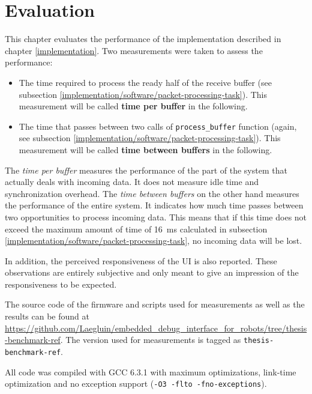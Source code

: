 \chapter{Evaluation}
\label{evaluation}


This chapter evaluates the performance of the implementation described in chapter \ref{implementation}.
Two measurements were taken to assess the performance:

\begin{itemize}
    \item The time required to process the ready half of the receive buffer (see subsection
          \ref{implementation/software/packet-processing-task}). This measurement will be called
          \textbf{time per buffer} in the following.
    \item The time that passes between two calls of \lstinline{process_buffer} function (again, see
          subsection \ref{implementation/software/packet-processing-task}). This measurement will be
          called \textbf{time between buffers} in the following.
\end{itemize}

The \textit{time per buffer} measures the performance of the part of the system that actually deals
with incoming data. It does not measure idle time and synchronization overhead. The
\textit{time between buffers} on the other hand measures the performance of the entire system. It
indicates how much time passes between two opportunities to process incoming data. This means that
if this time does not exceed the maximum amount of time of \SI{16}{\milli\second} calculated in
subsection \ref{implementation/software/packet-processing-task}, no incoming data will be lost.

In addition, the perceived responsiveness of the UI is also reported. These observations are entirely
subjective and only meant to give an impression of the responsiveness to be expected.

The source code of the firmware and scripts used for measurements as well as the results can be found
at \url{https://github.com/Laegluin/embedded_debug_interface_for_robots/tree/thesis-benchmark-ref}.
The version used for measurements is tagged as \lstinline{thesis-benchmark-ref}.

All code was compiled with GCC 6.3.1 with maximum optimizations, link-time optimization and no
exception support (\lstinline{-O3 -flto -fno-exceptions}).

